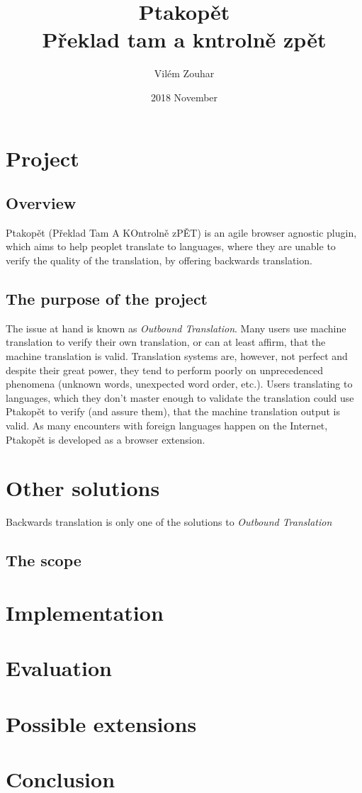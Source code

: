 \documentclass[a4paper]{article}
\begin{document}
\title{Ptakopět \\ \large Překlad tam a kntrolně zpět}
\author{Vilém Zouhar}
\date{2018 November}
\maketitle 


\section*{Project}
\subsection*{Overview}
Ptakopět (Překlad Tam A KOntrolně zPĚT) is an agile browser agnostic plugin, which aims to help peoplet translate to languages, where they are unable to verify the quality of the translation, by offering backwards translation.

\subsection*{The purpose of the project}
The issue at hand is known as \textit{Outbound Translation}. Many users use machine translation to verify their own translation, or can at least affirm, that the machine translation is valid. Translation systems are, however, not perfect and despite their great power, they tend to perform poorly on unprecedenced phenomena (unknown words, unexpected word order, etc.). Users translating to languages, which they don't master enough to validate the translation could use Ptakopět to verify (and assure them), that the machine translation output is valid. As many encounters with foreign languages happen on the Internet, Ptakopět is developed as a browser extension.

\section*{Other solutions}
Backwards translation is only one of the solutions to \textit{Outbound Translation}

\subsection*{The scope}


\section*{Implementation}

\section*{Evaluation}

\section*{Possible extensions}


\section*{Conclusion}
\end{document}

